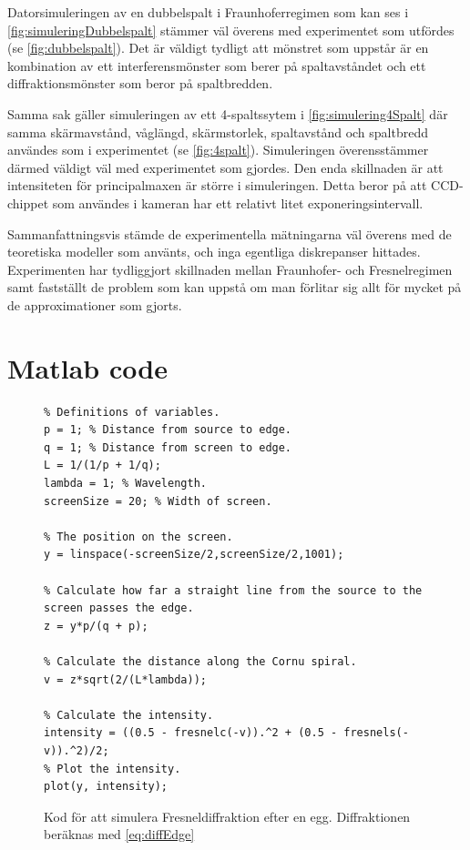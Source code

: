 \documentclass[a4paper]{article}
\begin{document}
  Datorsimuleringen av en dubbelspalt i Fraunhoferregimen som kan ses i \autoref{fig:simuleringDubbelspalt} stämmer väl överens med experimentet som utfördes (se \autoref{fig:dubbelspalt}). Det är väldigt tydligt att mönstret som uppstår är en kombination av ett interferensmönster som berer på spaltavståndet och ett diffraktionsmönster som beror på spaltbredden.

  Samma sak gäller simuleringen av ett 4-spaltssytem i \autoref{fig:simulering4Spalt} där samma skärmavstånd, våglängd, skärmstorlek, spaltavstånd och spaltbredd användes som i experimentet (se \autoref{fig:4spalt}). Simuleringen överensstämmer därmed väldigt väl med experimentet som gjordes. Den enda skillnaden är att intensiteten för principalmaxen är större i simuleringen. Detta beror på att CCD-chippet som användes i kameran har ett relativt litet exponeringsintervall.

  Sammanfattningsvis stämde de experimentella mätningarna väl överens med de teoretiska modeller som använts, och inga egentliga diskrepanser hittades. Experimenten har tydliggjort skillnaden mellan Fraunhofer- och Fresnelregimen samt fastställt de problem som kan uppstå om man förlitar sig allt för mycket på de approximationer som gjorts.

 
 {}
 

\clearpage
\appendix

\section{Matlab code} \label{apx:code}

\FloatBarrier

  \begin{figure}[ht]
  \centering
  \begin{lstlisting}
% Definitions of variables.
p = 1; % Distance from source to edge.
q = 1; % Distance from screen to edge.
L = 1/(1/p + 1/q);
lambda = 1; % Wavelength.
screenSize = 20; % Width of screen.

% The position on the screen.
y = linspace(-screenSize/2,screenSize/2,1001);

% Calculate how far a straight line from the source to the screen passes the edge.
z = y*p/(q + p);

% Calculate the distance along the Cornu spiral.
v = z*sqrt(2/(L*lambda));

% Calculate the intensity.
intensity = ((0.5 - fresnelc(-v)).^2 + (0.5 - fresnels(-v)).^2)/2;
% Plot the intensity.
plot(y, intensity);
  \end{lstlisting}
  \caption{Kod för att simulera Fresneldiffraktion efter en egg. Diffraktionen beräknas med \eqref{eq:diffEdge}}
  \label{fig:FresnCode}
  \end{figure}
\end{document}
